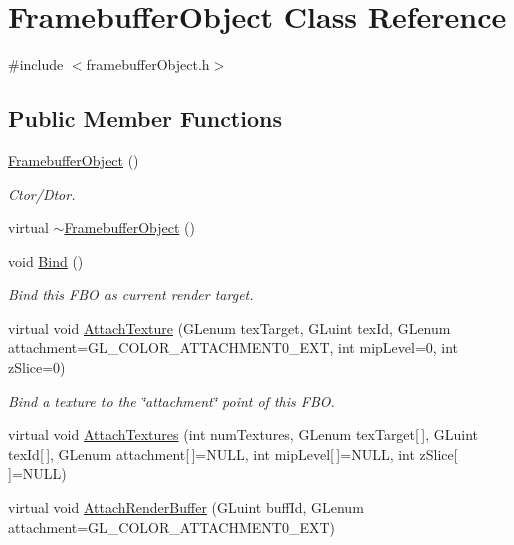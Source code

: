 \hypertarget{class_framebuffer_object}{
\section{FramebufferObject Class Reference}
\label{class_framebuffer_object}
}


{\ttfamily \#include $<$framebufferObject.h$>$}

\subsection*{Public Member Functions}
\begin{DoxyCompactItemize}
\item 
\hyperlink{class_framebuffer_object_ad49fee576a90d0a23ac7af93d82d5bbf}{FramebufferObject} ()
\begin{DoxyCompactList}\small\item\em Ctor/Dtor. \end{DoxyCompactList}\item 
virtual \hyperlink{class_framebuffer_object_ae7c58315d303776dc3e14832fe675abb}{$\sim$FramebufferObject} ()
\item 
void \hyperlink{class_framebuffer_object_a1916acbbe9aafb8302dc117a7cce6fcd}{Bind} ()
\begin{DoxyCompactList}\small\item\em Bind this FBO as current render target. \end{DoxyCompactList}\item 
virtual void \hyperlink{class_framebuffer_object_a5c7418c7b49f7a4b56c0575adb9a09a8}{AttachTexture} (GLenum texTarget, GLuint texId, GLenum attachment=GL\_\-COLOR\_\-ATTACHMENT0\_\-EXT, int mipLevel=0, int zSlice=0)
\begin{DoxyCompactList}\small\item\em Bind a texture to the \char`\"{}attachment\char`\"{} point of this FBO. \end{DoxyCompactList}\item 
virtual void \hyperlink{class_framebuffer_object_af83643f5ea3bfedd8c17c8db9f2d8e64}{AttachTextures} (int numTextures, GLenum texTarget\mbox{[}$\,$\mbox{]}, GLuint texId\mbox{[}$\,$\mbox{]}, GLenum attachment\mbox{[}$\,$\mbox{]}=NULL, int mipLevel\mbox{[}$\,$\mbox{]}=NULL, int zSlice\mbox{[}$\,$\mbox{]}=NULL)
\item 
virtual void \hyperlink{class_framebuffer_object_ad6af74957e36f61102d492fa6a5908f5}{AttachRenderBuffer} (GLuint buffId, GLenum attachment=GL\_\-COLOR\_\-ATTACHMENT0\_\-EXT)

\end{DoxyCompactItemize}
